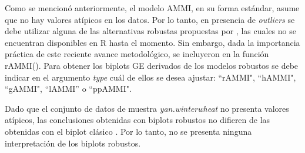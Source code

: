

Como se mencionó anteriormente, el modelo AMMI, en su forma estándar, asume que no hay valores atípicos en los datos. Por lo tanto, en presencia de \emph{outliers} se debe utilizar alguna de las alternativas robustas propuestas por \citet{Rodriguesetal2016}, las cuales no se encuentran disponibles en R hasta el momento. Sin embargo, dada la importancia práctica de este reciente avance metodológico, se incluyeron en la función \textcolor{fandango}{rAMMI()}. Para obtener los biplots GE derivados de los modelos robustos se debe indicar en el argumento \emph{type} cuál de ellos se desea ajustar: ``rAMMI", ``hAMMI", ``gAMMI", ``lAMMI'' o ``ppAMMI".

Dado que el conjunto de datos de muestra \emph{yan.winterwheat} no presenta valores atípicos, las conclusiones obtenidas con biplots robustos no difieren de las obtenidas con el biplot clásico \citep{Rodriguesetal2016}. Por lo tanto, no se presenta ninguna interpretación de los biplots robustos. 


